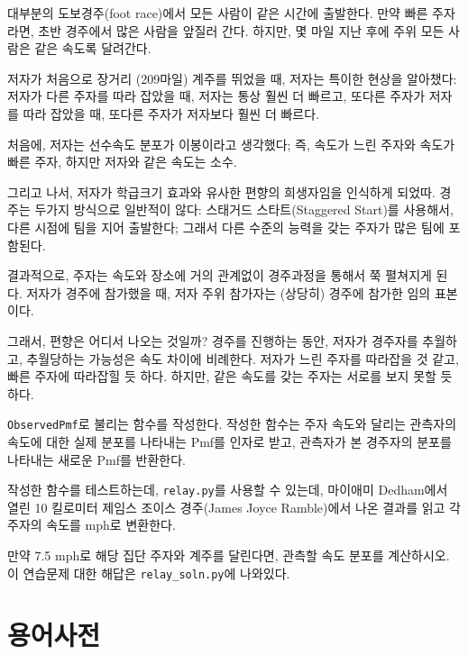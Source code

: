 \begin{exercise}
\label{relay}

대부분의 도보경주(foot race)에서 모든 사람이 같은 시간에 출발한다.
만약 빠른 주자라면, 초반 경주에서 많은 사람을 앞질러 간다.
하지만, 몇 마일 지난 후에 주위 모든 사람은 같은 속도록 달려간다.


저자가 처음으로 장거리 (209마일) 계주를 뛰었을 때, 저자는 특이한 현상을 알아챘다:
저자가 다른 주자를 따라 잡았을 때, 저자는 통상 훨씬 더 빠르고,
또다른 주자가 저자를 따라 잡았을 때, 또다른 주자가 저자보다 훨씬 더 빠르다.

처음에, 저자는 선수속도 분포가 이봉이라고 생각했다;
즉, 속도가 느린 주자와 속도가 빠른 주자, 하지만 저자와 같은 속도는 소수.

그리고 나서, 저자가 학급크기 효과와 유사한 편향의 희생자임을 인식하게 되었따.
경주는 두가지 방식으로 일반적이 않다: 스태거드 스타트(Staggered Start)를 사용해서, 다른 시점에 팀을 지어 출발한다; 그래서 다른 수준의 능력을 갖는 주자가 많은 팀에 포함된다.

 

결과적으로, 주자는 속도와 장소에 거의 관계없이 경주과정을 통해서 쭉 펼쳐지게 된다.
저자가 경주에 참가했을 때, 저자 주위 참가자는 (상당히) 경주에 참가한 임의 표본이다.

그래서, 편향은 어디서 나오는 것일까? 경주를 진행하는 동안, 저자가 경주자를 추월하고, 추월당하는 가능성은 속도 차이에 비례한다. 저자가 느린 주자를 따라잡을 것 같고, 
빠른 주자에 따라잡힐 듯 하다. 하지만, 같은 속도를 갖는 주자는 서로를 보지 못할 듯 하다.

{\tt ObservedPmf}로 불리는 함수를 작성한다.
작성한 함수는 주자 속도와 달리는 관측자의 속도에 대한 실제 분포를 나타내는 Pmf를 인자로 받고, 관측자가 본 경주자의 분포를 나타내는 새로운 Pmf를 반환한다.


작성한 함수를 테스트하는데, {\tt relay.py}를 사용할 수 있는데,
마이애미 Dedham에서 열린 10 킬로미터 제임스 조이스 경주(James Joyce Ramble)에서 
나온 결과를 읽고 각 주자의 속도를 mph로 변환한다.

만약 7.5 mph로 해당 집단 주자와 계주를 달린다면, 관측할 속도 분포를 계산하시오.
이 연습문제 대한 해답은 \verb"relay_soln.py"에 나와있다.
\end{exercise}


\section{용어사전}

